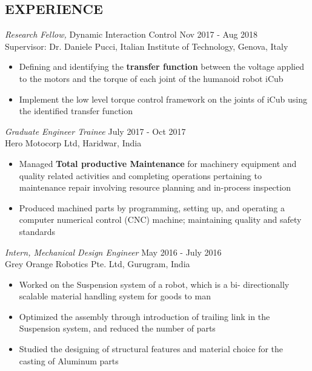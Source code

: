 \documentclass[margin, 10pt]{res} %
\begin{document}
\begin{resume}
\section{EXPERIENCE}

{\sl Research Fellow, }Dynamic Interaction Control \hfill Nov 2017 - Aug 2018 \\
Supervisor: Dr. Daniele Pucci, Italian Institute of Technology, Genova, Italy\\

\begin{itemize}
	\item  Defining and identifying the \textbf{transfer function} between the voltage applied to the motors and the torque of each joint of the humanoid robot iCub
	\item  Implement the low level torque control framework on the joints of iCub using the identified transfer function

\end{itemize} 

{\sl Graduate Engineer Trainee} \hfill July 2017 - Oct 2017 \\
Hero Motocorp Ltd, Haridwar, India\\

\begin{itemize}
	\item Managed \textbf{Total productive Maintenance} for machinery
	equipment and quality related activities and completing operations pertaining to maintenance repair
	involving resource planning and in-process inspection
	\item Produced machined parts by programming, setting up, and operating a computer numerical control (CNC) machine;
	maintaining quality and safety standards

	
\end{itemize} 
{\sl Intern, Mechanical Design Engineer} \hfill May 2016 - July 2016 \\
Grey Orange Robotics Pte. Ltd, Gurugram, India\\

\begin{itemize}
	\item Worked on the Suspension system of a robot, which is a bi- directionally scalable material handling system for goods to man
	\item Optimized the assembly through introduction of trailing link in the Suspension system, and reduced the number of parts
	\item Studied the designing of structural features and material choice for the casting of Aluminum parts


\end{itemize}
\end{resume}
\end{document}
